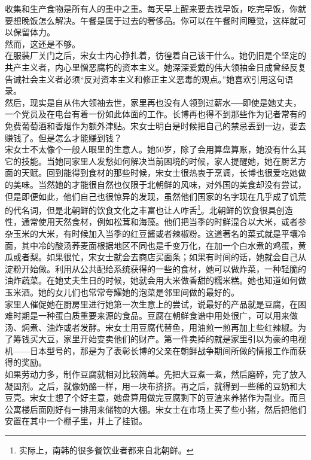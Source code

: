 收集和生产食物是所有人的重中之重。每天早上醒来要去找早饭，吃完早饭，你就要想晚饭怎么解决。午餐是属于过去的奢侈品。你可以在午餐时间睡觉，这样就可以保留体力。\\

然而，这还是不够。\\

在服装厂关门之后，宋女士内心挣扎着，彷徨着自己该干什么。她仍旧是个坚定的共产主义者，内心里憎恶腐朽的资本主义。她深深爱戴的伟大领袖金日成曾经反复告诫社会主义者必须“反对资本主义和修正主义恶毒的观点。”她喜欢引用这句语录。\\

然后，现实是自从伟大领袖去世，家里再也没有人领到过薪水──即使是她丈夫，一个党员及在电台有着一份如此体面的工作。长博再也得不到那些作为记者常有的免费葡萄酒和香烟作为额外津贴。宋女士明白是时候把自己的禁忌丢到一边，要去赚钱了。但是怎么才能赚到钱？\\

宋女士不太像个一般人眼里的生意人。她50岁，除了会用算盘算账，她没有什么其它的技能。当她同家里人发愁如何解决当前困境的时候，家人提醒她，她在厨艺方面的天赋。回到能得到食材的那些时候，宋女士很热衷于烹调，长博也很爱吃她做的美味。当然她的才能很自然也仅限于北朝鲜的风味，对外国的美食却没有尝试，但是即便如此，他们自己也很惊异的发现，虽然他们国家的名字现在几乎成了饥荒的代名词，但是北朝鲜的饮食文化之丰富也让人咋舌\footnote{实际上，南韩的很多餐饮业者都来自北朝鲜。}。北朝鲜的饮食很具创造性，通常使用天然食材，例如松茸和海藻。他们把当季的时鲜混合以大米，或者参杂玉米的大米，有时候加入当季的红豆酱或者辣椒粉。这道著名的菜式就是平壤冷面，其中冷的酸汤荞麦面根据地区不同也是千变万化，在加一个白水煮的鸡蛋，黄瓜或者梨。如果很忙，宋女士就会去商店买面条；如果有时间的话，她就会自己从淀粉开始做。利用从公共配给系统获得的一些的食材，她可以做炸菜，一种轻脆的油炸蔬菜。在她丈夫生日的时候，她就会用大米做香甜的糯米糕。她也知道如何做玉米酒。她的女儿们也常常夸耀她的泡菜是邻里间做的最好的。\\

家里人催促她在厨房里进行她第一次生意上的尝试，说最好的产品就是豆腐，在困难时期是一种蛋白质重要来源的食品。豆腐在朝鲜食谱中用处很广，可以用来做汤、焖煮、油炸或者发酵。宋女士用豆腐代替鱼，用油煎一煎再加上些红辣椒。为了筹钱买大豆，家里开始变卖他们的财产。第一件卖掉的就是家里引以为豪的电视机——日本型号的，那是为了表彰长博的父亲在朝鲜战争期间所做的情报工作而获得的奖励。\\

如果劳动力多，制作豆腐就相对比较简单。先把大豆煮一煮，然后磨碎，完了放入凝固剂。之后，就像奶酪一样，用一块布挤挤。再之后，就得到一些稀的豆奶和大豆壳。宋女士想了个好主意，她盘算用做完豆腐剩下的豆渣来养猪作为副业。而且公寓楼后面刚好有一排用来储物的大棚。宋女士在市场上买了些小猪，然后把他们安置在其中一个棚子里，并上了挂锁。\\

